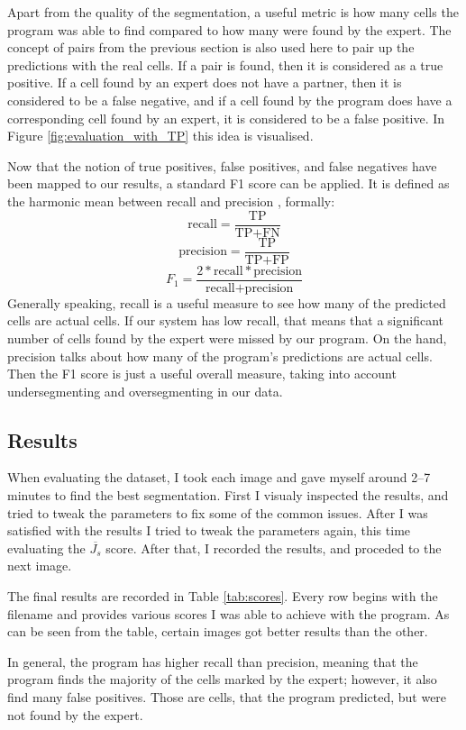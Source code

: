 \documentclass[
  digital,     %
  oneside,     %
  nosansbold,  %
  nocolorbold, %
  lof,         %
  lot,         %
]{fithesis4}
\begin{document}
Apart from the quality of the segmentation, a useful metric is how many cells
the program was able to find compared to how many were found by the expert. The
concept of pairs from the previous section is also used here to pair up the
predictions with the real cells. If a pair is found, then it is considered as a
true positive. If a cell found by an expert does not have a partner, then it is
considered to be a false negative, and if a cell found by the program does have
a corresponding cell found by an expert, it is considered to be a false
positive. In Figure \ref{fig:evaluation_with_TP} this idea is visualised.

Now that the notion of true positives, false positives, and false negatives have
been mapped to our results, a standard F1 score can be applied. It is defined as
the harmonic mean between recall and precision \cite{sklearn-f1score}, formally:
$$\text{recall} = \frac{\text{TP}}{\text{TP} + \text{FN}}$$
$$\text{precision} = \frac{\text{TP}}{\text{TP} + \text{FP}}$$
$$F_1 = \frac{2 * \text{recall} * \text{precision}}{\text{recall} +
\text{precision}}$$
Generally speaking, recall is a useful measure to see how many of the predicted
cells are actual cells. If our system has low recall, that means that a
significant number of cells found by the expert were missed by our program. On
the hand, precision talks about how many of the program's predictions are actual
cells. Then the F1 score is just a useful overall measure, taking into account
undersegmenting and oversegmenting in our data.

\subsection{Results}
When evaluating the dataset, I took each image and gave myself around 2--7
minutes to find the best segmentation. First I visualy inspected the results,
and tried to tweak the parameters to fix some of the common issues. After I was
satisfied with the results I tried to tweak the parameters again, this time
evaluating the $\overline{J_s}$ score. After that, I recorded the results, and
proceded to the next image.

The final results are recorded in Table \ref{tab:scores}. Every row begins
with the filename and provides various scores I was able to achieve with the
program. As can be seen from the table, certain images got better results than
the other. 

In general, the program has higher recall than precision, meaning that the
program finds the majority of the cells marked by the expert; however, it also
find many false positives. Those are cells, that the program predicted, but were
not found by the expert.
\end{document}
